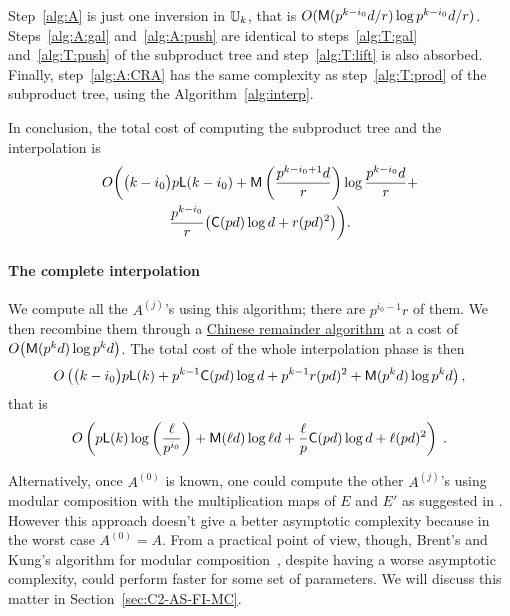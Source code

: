 Step~\ref{alg:A} is just one inversion in $\mathbb{U}_k$, that is
$O(\mathsf{M}(p^{k-i_0}d/r)\log p^{k-i_0}d/r)$. Steps~\ref{alg:A:gal}
and~\ref{alg:A:push} are identical to steps~\ref{alg:T:gal}
and~\ref{alg:T:push} of the subproduct tree and step~\ref{alg:T:lift}
is also absorbed. Finally, step~\ref{alg:A:CRA} has the same
complexity as step~\ref{alg:T:prod} of the subproduct tree, using the
Algorithm~\ref{alg:interp}.

In conclusion, the total cost of computing the subproduct tree and the
interpolation is
\begin{multline*}
  O\biggl(\bigl(k-i_0\bigr)p\mathsf{L}(k-i_0) + \mathsf{M}\left(\frac{p^{k-i_0+1}d}{r}\right)\log \frac{p^{k-i_0}d}{r} +\\
    \frac{p^{k-i_0}}{r}\bigl(\mathsf{C}(pd)\log d + r(pd)^2\bigr)\biggr)
  \text{.}
\end{multline*}


\paragraph{The complete interpolation}
We compute all the $A^{(j)}$'s using this algorithm; there are
$p^{i_0-1}r$ of them. We then recombine them through a
\hyperref[sec:chin-rema-algor]{Chinese remainder algorithm} at a cost
of $O\bigl(\mathsf{M}(p^kd)\log p^kd\bigr)$. The total cost of the whole
interpolation phase is then
\begin{multline*}
  O\left(\bigl(k-i_0\bigr) p\mathsf{L}(k) + p^{k-1}\mathsf{C}(pd)\log d +
    p^{k-1}r(pd)^2 + \mathsf{M}(p^kd)\log p^kd \right)\text{,}
\end{multline*}
that is
\begin{equation}
  \label{eq:interp}
  O\left(p\mathsf{L}(k)\log\left(\frac{\ell}{p^{i_0}}\right) + 
    \mathsf{M}(\ell d)\log\ell d +
    \frac{\ell}{p}\mathsf{C}(pd)\log d +
    \ell (pd)^2
  \right)
  \;\text{.}
\end{equation}

Alternatively, once $A^{(0)}$ is known, one could compute the other
$A^{(j)}$'s using modular composition with the multiplication maps of
$E$ and $E'$ as suggested in \cite{couveignes96}. However this
approach doesn't give a better asymptotic complexity because in the
worst case $A^{(0)}=A$. From a practical point of view, though,
Brent's and Kung's algorithm for modular
composition~\cite{brent+kung}, despite having a worse asymptotic
complexity, could perform faster for some set of parameters. We will
discuss this matter in Section~\ref{sec:C2-AS-FI-MC}.

